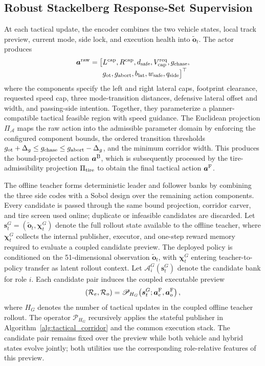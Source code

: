 \documentclass[journal,twoside,web]{ieeecolor}
\begin{document}
\subsection{Robust Stackelberg Response-Set Supervision}
\label{subsec:game_formulation}
At each tactical update, the encoder combines the two vehicle states, local
track preview, current mode, side lock, and execution health into
$\widetilde{\bm o}_t$. The actor produces
\begin{equation}
\begin{aligned}
\bm a^{\rm raw}=\bigl[&L^{\rm cap},R^{\rm cap},d_{\rm safe},
V_{\rm cap}^{\rm req},g_{\rm chase},\\[-1mm]
&g_{\rm ot},g_{\rm abort},b_{\rm lat},w_{\rm safe},
q_{\rm side}\bigr]^\top 
\end{aligned}
\label{eq:action_vec}
\end{equation}
where the components specify the left and right lateral caps, footprint
clearance, requested speed cap, three mode-transition distances, defensive
lateral offset and width, and passing-side intention. Together, they
parameterize a planner-compatible tactical feasible region with speed
guidance. The Euclidean projection $\Pi_{\mathcal A}$ maps the raw action into
the admissible parameter domain by enforcing the configured component bounds,
the ordered transition thresholds
$g_{\rm ot}+\Delta_g\le g_{\rm chase}\le
g_{\rm abort}-\Delta_g$, and the minimum corridor width. This produces the
bound-projected action $\bm a^{\rm B}$, which is subsequently processed by the
tire-admissibility projection $\Pi_{\rm tire}$ to obtain the final tactical
action $\bm a^{\rm F}$.


The offline teacher forms deterministic leader and follower banks by combining
the three side codes with a Sobol design over the remaining action components.
Every candidate is passed through the same bound projection, corridor carver,
and tire screen used online; duplicate or infeasible candidates are discarded.
Let
\(
\bm s_t^G=(\widetilde{\bm o}_t,\bm\chi_t^G)
\)
denote the full rollout state available to the offline teacher, where
\(\bm\chi_t^G\) collects the internal publisher, executor, and one-step
reward memory required to evaluate a coupled candidate preview. The deployed
policy is conditioned on the 51-dimensional observation
\(\widetilde{\bm o}_t\), with \(\bm\chi_t^G\) entering teacher-to-policy
transfer as latent rollout context. Let \(\mathcal A_i^G(\bm s_t^G)\) denote
the candidate bank for role \(i\).
Each candidate pair induces the coupled executable preview
\begin{equation}
(\mathcal R_e,\mathcal R_o)=
\mathscr P_{H_G}\!\left(
\bm s_t^G;\bm a_e^{\rm F},\bm a_o^{\rm F}\right),
\label{eq:coupled_game_preview}
\end{equation}
where $H_G$ denotes the number of tactical updates in the coupled offline
teacher rollout. The operator $\mathscr P_{H_G}$ recursively applies the stateful
publisher in Algorithm~\ref{alg:tactical_corridor} and the common execution stack.
The candidate pair remains fixed over the preview while both vehicle and
hybrid states evolve jointly; both utilities use the corresponding
role-relative features of this preview.
\end{document}

